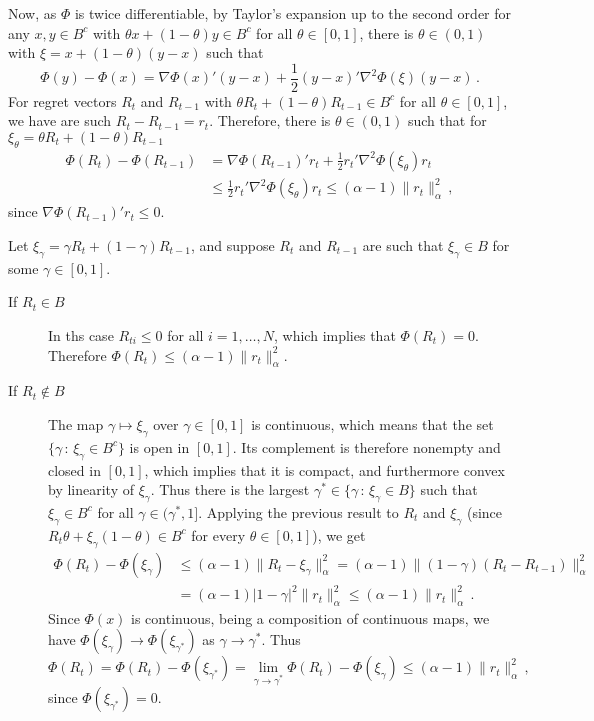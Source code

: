 \documentclass[a4paper]{article}
\begin{document}
Now, as $\Phi$ is twice differentiable, by Taylor's expansion up to the second order
for any $x, y \in B^c$ with $\theta x + (1-\theta)y \in B^c$ for all $\theta \in[0,1]$,
there is $\theta \in (0,1)$ with $\xi = x + (1-\theta)(y-x)$ such that
\begin{equation*}
  \Phi(y) - \Phi(x) = \nabla \Phi(x)'(y-x) + \frac{1}{2}(y-x)' \nabla^2 \Phi(\xi) (y-x) \,.
\end{equation*}
For regret vectors $R_t$ and $R_{t-1}$ with $\theta R_t + (1-\theta)R_{t-1} \in B^c$
for all $\theta \in[0,1]$, we have are such $R_t - R_{t-1} = r_t$. Therefore, there is
$\theta\in (0, 1)$ such that for $\xi_\theta = \theta R_t + (1-\theta)R_{t-1}$
\begin{align*}
  \Phi(R_t) - \Phi(R_{t-1})
    &= \nabla \Phi(R_{t-1})'r_t + \frac{1}{2}r_t' \nabla^2 \Phi(\xi_\theta) r_t \\
    &\leq \frac{1}{2}r_t' \nabla^2 \Phi(\xi_\theta) r_t
    \leq (\alpha-1) \|r_t\|_\alpha^2 \,,
\end{align*}
since $\nabla \Phi(R_{t-1})'r_t \leq 0$.

Let $\xi_\gamma = \gamma R_t + (1-\gamma)R_{t-1}$, and suppose $R_t$ and $R_{t-1}$
are such that $\xi_\gamma \in B$ for some $\gamma\in [0,1]$.
\begin{description}
  \item[If $R_t\in B$] In ths case $R_{ti}\leq 0$ for all $i=1,\ldots,N$, which implies
  that $\Phi(R_t) = 0$. Therefore $\Phi(R_t) \leq (\alpha-1) \|r_t\|_\alpha^2$.
  \item [If $R_t \notin B$] The map $\gamma \mapsto\xi_\gamma$ over $\gamma\in [0,1]$
  is continuous, which means that the set $\{\gamma\,:\, \xi_\gamma \in B^c\}$ is
  open in $[0,1]$. Its complement is therefore nonempty and closed in $[0,1]$, which
  implies that it is compact, and furthermore convex by linearity of $\xi_\gamma$.
  Thus there is the largest $\gamma^* \in \{\gamma\,:\, \xi_\gamma \in B\}$ such
  that $\xi_\gamma \in B^c$ for all $\gamma\in (\gamma^*, 1]$. Applying the previous
  result to $R_t$ and $\xi_\gamma$ (since $R_t \theta + \xi_\gamma (1-\theta) \in B^c$
  for every $\theta\in[0,1]$), we get
  \begin{align*}
    \Phi(R_t) - \Phi(\xi_\gamma)
      &\leq (\alpha-1) \|R_t - \xi_\gamma\|_\alpha^2
      = (\alpha-1) \|(1-\gamma)(R_t - R_{t-1})\|_\alpha^2 \\
      &= (\alpha-1) |1-\gamma|^2 \|r_t\|_\alpha^2
      \leq (\alpha-1) \|r_t\|_\alpha^2 \,.
  \end{align*}
  Since $\Phi(x)$ is continuous, being a composition of continuous maps, we have
  $\Phi(\xi_\gamma) \to \Phi(\xi_{\gamma^*})$ as $\gamma\to\gamma^*$. Thus
  \begin{equation*}
    \Phi(R_t)
      = \Phi(R_t) - \Phi(\xi_{\gamma^*})
      = \lim_{\gamma\to\gamma^*} \Phi(R_t) - \Phi(\xi_\gamma)
      \leq (\alpha-1) \|r_t\|_\alpha^2 \,,
  \end{equation*}
  since $\Phi(\xi_{\gamma^*})=0$.
\end{description}
\end{document}
